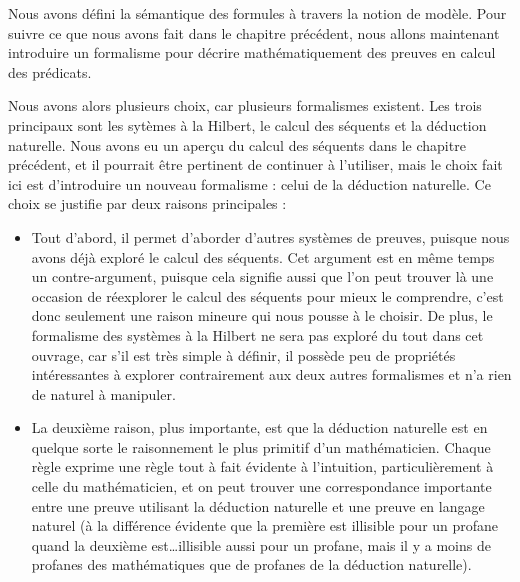 Nous avons défini la sémantique des formules à travers la notion de modèle. Pour
suivre ce que nous avons fait dans le chapitre précédent, nous allons maintenant
introduire un formalisme pour décrire mathématiquement des preuves en calcul des
prédicats.

Nous avons alors plusieurs choix, car plusieurs formalismes existent. Les trois
principaux sont les sytèmes à la Hilbert, le calcul des séquents et la déduction
naturelle. Nous avons eu un aperçu du calcul des séquents dans le chapitre
précédent, et il pourrait être pertinent de continuer à l'utiliser, mais le
choix fait ici est d'introduire un nouveau formalisme : celui de la déduction
naturelle. Ce choix se justifie par deux raisons principales :
\begin{itemize}
\item Tout d'abord, il permet d'aborder d'autres systèmes de preuves, puisque
  nous avons déjà exploré le calcul des séquents. Cet argument est en même temps
  un contre-argument, puisque cela signifie aussi que l'on peut trouver là une
  occasion de réexplorer le calcul des séquents pour mieux le comprendre, c'est
  donc seulement une raison mineure qui nous pousse à le choisir. De plus, le
  formalisme des systèmes à la Hilbert ne sera pas exploré du tout dans cet
  ouvrage, car s'il est très simple à définir, il possède peu de propriétés
  intéressantes à explorer contrairement aux deux autres formalismes et n'a rien
  de naturel à manipuler.
\item La deuxième raison, plus importante, est que la déduction naturelle est en
  quelque sorte le raisonnement le plus primitif d'un mathématicien. Chaque
  règle exprime une règle tout à fait évidente à l'intuition, particulièrement à
  celle du mathématicien, et on peut trouver une correspondance importante
  entre une preuve utilisant la déduction naturelle et une preuve en langage
  naturel (à la différence évidente que la première est illisible pour un
  profane quand la deuxième est\ldots illisible aussi pour un profane, mais il y
  a moins de profanes des mathématiques que de profanes de la déduction
  naturelle).
\end{itemize}

